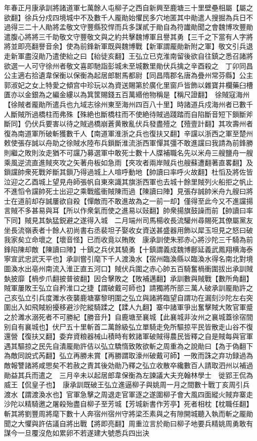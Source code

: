 年春正月康承訓將諸道軍七萬餘人屯柳子之西自新興至鹿塘三十里壁壘相屬【屬之欲翻】徐兵分戍四境城中不及數千人龎勛始懼民多穴地匿其中勛遣人搜掘為兵日不過得三二十人勛將孟敬文守豐縣狡悍而兵多謀貳于勛自為符䜟勛聞之會魏博攻豐勛遣腹心將將三千助敬文守豐敬文與之約共擊魏博軍且譽其勇【三千之下當有人字將將並即亮翻譽音余】使為前鋒新軍既與魏博戰【新軍謂龎勛新附之軍】敬文引兵退走新軍盡沒勛乃遣使紿之曰【紿徒亥翻】王弘立已克淮南留後欲自往鎮之悉召諸將欲選一人可守徐州者敬文喜即馳詣彭城未至城數里勛伏兵擒之辛酉殺之　丁卯同昌公主適右拾遺韋保衡以保衡為起居郎駙馬都尉【同昌隋郡名唐為疊州常芬縣】公主郭淑妃之女上特愛之傾宫中珍玩以為資送賜第於廣化里窗戶皆飾以雜寶井欄藥臼槽匱亦以金銀為之編金縷以為箕筐賜錢五百萬緡他物稱是【稱尺證翻】　徐賊寇海州【徐賊者龎勛所遣兵也九域志徐州東至海州四百八十里】時諸道兵戍海州者已數千人斷賊所過橋柱而弗殊【殊絶也斷橋柱而不使絶待賊過踐踏而自陷斷音短下鎻斷斧斷同】仍伏兵要害以待之賊過橋崩蒼黄散亂伏兵發盡殪之【殪壹計翻】其攻壽州者復為南道軍所破斬獲數千人【南道軍淮浙之兵也復扶又翻】辛讜以浙西之軍至楚州敕使張存誠以舟助之徐賊水陸布兵鎻斷淮流浙西軍憚其彊不敢進讜曰我請為前鋒勝則繼之敗則汝走猶不可讜乃募選軍中敢死士數十人牒補職名先以米舟三艘鹽舟一艘乘風逆流直進賊夾攻之矢著舟板如急雨【夾攻者兩岸賊兵也艘蘇遭翻著直畧翻】及鎻讜帥衆死戰斧斷其鎻乃得過城上人喧呼動地【帥讀曰率呼火故翻】杜慆及將佐皆泣迎之乙酉城上望見舟師張帆自東來識其旗浙西軍也去城十餘里賊列火船拒之帆止不進慆令讜帥死士出迎之乘戰艦衝賊陳而過【陳讀曰陣】見張存誠帥米舟九艘曰將士在道前却存誠屢欲自殺【憚敵而不敢進故為之一前一却】僅得至此今又不進讜揚言賊不多甚易與耳【所以作衆氣而使之進易以䜴翻】帥衆揚旗鼓譟而前【帥讀曰率下同】賊見其埶猛鋭避之遂得入城　二月端州司馬楊收長流驩州尋賜死其僚屬黨友坐長流嶺表者十餘人初尚書右丞裴坦子娶收女資送甚盛器用飾以犀玉坦見之怒曰破我家矣立命壞之【壞音怪】已而收竟以賄敗　康承訓使朱邪赤心將沙陀三千騎為前鋒陷陳却敵【陳讀曰陣】十鎮之兵伏其驍勇【十鎮謂義成魏博鄜延義武鳳翔横海泰寧宣武忠武天平也】承訓嘗引麾下千人渡渙水【宿州臨渙縣以臨渙水得名南北對境圖渙水出亳州南流入淮正直五河口】賊伏兵圍之赤心帥五百騎奮楇衝圍拔出承訓賊埶披靡【楇步爪翻披普彼翻】因合擊敗之【敗補邁翻】承訓數與賊戰【數所角翻】賊軍屢敗王弘立自矜淮口之捷【謂破戴可師也】請獨將所部三萬人破承訓龎勛許之己亥弘立引兵度濉水夜襲鹿塘寨黎明圍之弘立與諸將臨望自謂功在漏刻沙陀左右突圍出入如飛賊紛擾移避沙陀縱騎蹂之【蹂人九翻】寨中諸軍爭出奮擊賊大敗官軍蹙之於濉水溺死者不可勝紀【勝音升】自鹿塘至襄城【此襄城非汝州之襄城蓋徐宿間别自有襄城也】伏尸五十里斬首二萬餘級弘立單騎走免所驅掠平民皆散走山谷不復還營【復扶又翻】委弃資粮器械山積時有敕諸軍破賊得農民皆釋之自是賊每與官軍遇其驅掠之民先自潰龎勛許佶以弘立驕惰致敗欲斬之周重為之說勛曰【為于偽翻下為敵同說式芮翻】弘立再勝未賞【再勝謂取濠州破戴可師】一敗而誅之弃功録過為敵報讐諸將咸愳矣不若赦之責其後効勛乃釋之弘立收散卒纔數百人請取泗州以補過勛益其兵而遣之　三月辛未以起居郎韋保衡為左諫議大夫充翰林學士　徙郢王侃為威王【侃皇子也】　康承訓既破王弘立進逼柳子與姚周一月之間數十戰丁亥周引兵渡水【謂渡渙水也】官軍急擊之周退走官軍逐之遂圍柳子會大風四面縱火賊弃寨走沙陀以精騎邀之屠殺殆盡自柳子至芳城【芳城新書作芳亭】死者相枕【枕職任翻】斬其將劉豐周將麾下數十人奔宿州宿州守將梁丕素與之有隙開城聽入執而斬之龎勛聞之大懼與許佶議自將出戰【將即亮翻】周重泣言於勛曰柳子地要兵精姚周勇敢有謀今一旦覆沒危如累卵不若遂建大號悉兵四出決